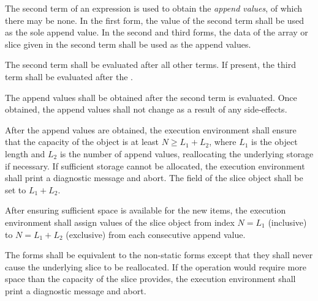 \specsubsubitem
The second term of an  expression is used to obtain the
\textit{append values}, of which there may be none. In the first form, the
value of the second term shall be used as the sole append value. In the second
and third forms, the data of the array or slice given in the second term shall
be used as the append values.

\specsubsubitem
The second term shall be evaluated after all other terms. If present, the third
term shall be evaluated after the .

\specsubsubitem
The append values shall be obtained after the second term is evaluated. Once
obtained, the append values shall not change as a result of any side-effects.

\specsubsubitem
After the append values are obtained, the execution environment shall ensure
that the capacity of the object is at least $N \geq L_1 + L_2$, where $L_1$ is
the object length and $L_2$ is the number of append values, reallocating the
underlying storage if necessary. If sufficient storage cannot be allocated, the
execution environment shall print a diagnostic message and abort. The
 field of the slice object shall be set to $L_1 + L_2$.

\specsubsubitem
After ensuring sufficient space is available for the new items, the execution
environment shall assign values of the slice object from index $N = L_1$
(inclusive) to $N = L_1 + L_2$ (exclusive) from each consecutive append value.

\specsubsubitem
The  forms shall be equivalent to the non-static forms except
that they shall never cause the underlying slice to be reallocated. If the
operation would require more space than the capacity of the slice provides, the
execution environment shall print a diagnostic message and abort.


\begin{grammar}
 \\
	  \terminal{(}  \terminal{,}  \terminal{)} \\
	  \terminal{(}  \terminal{,}   \terminal{)} \\
	  \terminal{(}  \terminal{,}  \terminal{,}  \terminal{)} \\
\end{grammar}

